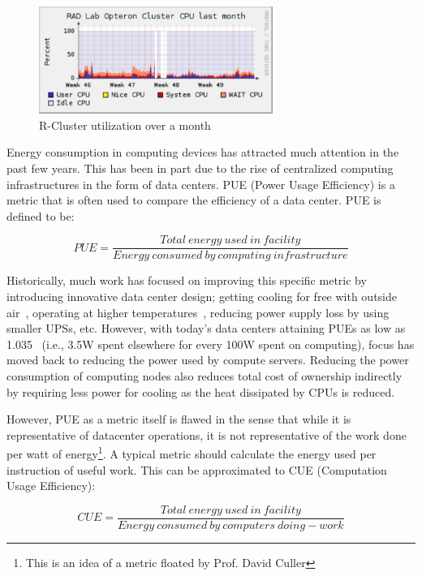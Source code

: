 \begin{figure}[ht]
\centering
\begin{center}
\includegraphics[width=3.0in]{graphs/Rcluster-nov-usage.pdf}
\vspace{-0.1in}
\caption{{\normalsize R-Cluster utilization over a month}\label{fig:r-utilization}}
\vspace{-0.1in}
\end{center}
\end{figure}

Energy consumption in computing devices has attracted much attention in the past few years. This has been in part due to the rise of centralized computing infrastructures in the form of data centers. PUE (Power Usage Efficiency) is a metric that is often used to compare the efficiency of a data center. PUE is defined to be:
\begin{scriptsize}
    \begin{equation}
        PUE = \frac{Total~energy~used~in~facility}{Energy~consumed~by~computing~infrastructure}
        \label{eq:pue}
    \end{equation}
\end{scriptsize}
Historically, much work has focused on improving this specific metric by introducing innovative data center design; getting cooling for free with outside air~\cite{Neil:06}, operating at higher temperatures~\cite{Ratnesh:05}, reducing power supply loss by using smaller UPSs, etc. However, with today's data centers attaining PUEs as low as 1.035~\cite{Sandia:09} (i.e., 3.5W spent elsewhere for every 100W spent on computing), focus has moved back to reducing the power used by compute servers. Reducing the power consumption of computing nodes also reduces total cost of ownership indirectly~\cite{Luiz:07} by requiring less power for cooling as the heat dissipated by CPUs is reduced.

However, PUE as a metric itself is flawed in the sense that while it is representative of datacenter operations, it is not representative of the work done per watt of energy\footnote{This is an idea of a metric floated by Prof. David Culler}. A typical metric should calculate the energy used per instruction of useful work. This can be approximated to CUE (Computation Usage Efficiency):
\begin{scriptsize}
    \begin{equation}
        CUE = \frac{Total~energy~used~in~facility}{Energy~consumed~by~computers~doing-work}
        \label{eq:cue}
    \end{equation}
\end{scriptsize}

